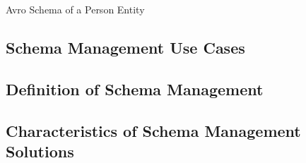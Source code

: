 \begin{listing}[H]
  \inputminted{json}{assets/src/Person.avsc}
  \label{lst:avro-schema-person}
  \caption{Avro Schema of a Person Entity}
\end{listing}


\subsection{Schema Management Use Cases}

\subsection{Definition of Schema Management}

\subsection{Characteristics of Schema Management Solutions}

